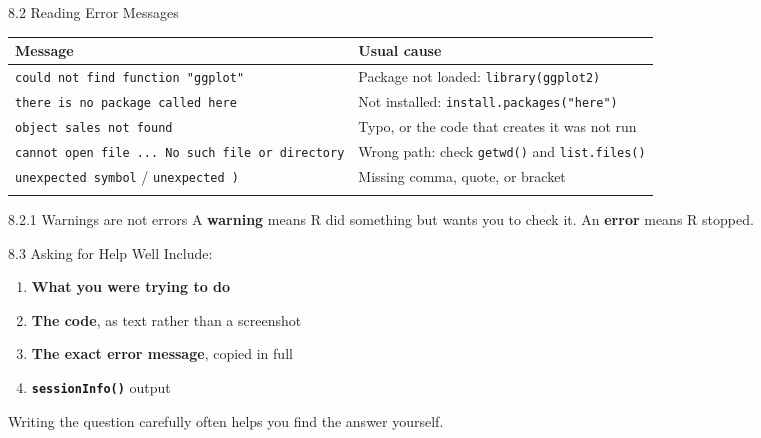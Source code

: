 \documentclass[
  ignorenonframetext,
  aspectratio=169,
]{beamer}
\newcounter{none} %
\providecommand{\tightlist}{%
  \setlength{\itemsep}{0pt}\setlength{\parskip}{0pt}}
\begin{document}
\begin{frame}[fragile]{8.2 Reading Error Messages}
\protect{}\label{reading-error-messages}
{\def\LTcaptype{none} %
\begin{longtable}[]{@{}
  >{\raggedright\arraybackslash}p{}
  >{\raggedright\arraybackslash}p{}@{}}
\toprule\noalign{}
\begin{minipage}[b]{\linewidth}\raggedright
Message
\end{minipage} & \begin{minipage}[b]{\linewidth}\raggedright
Usual cause
\end{minipage} \\
\midrule\noalign{}
\endhead
\texttt{could\ not\ find\ function\ "ggplot"} & Package not loaded:
\texttt{library(ggplot2)} \\
\texttt{there\ is\ no\ package\ called\ \textquotesingle{}here\textquotesingle{}}
& Not installed: \texttt{install.packages("here")} \\
\texttt{object\ \textquotesingle{}sales\textquotesingle{}\ not\ found} &
Typo, or the code that creates it was not run \\
\texttt{cannot\ open\ file\ ...\ No\ such\ file\ or\ directory} & Wrong
path: check \texttt{getwd()} and \texttt{list.files()} \\
\texttt{unexpected\ symbol} /
\texttt{unexpected\ \textquotesingle{})\textquotesingle{}} & Missing
comma, quote, or bracket \\
\bottomrule\noalign{}
\end{longtable}
}

\begin{exampleblock}{8.2.1 Warnings are not errors}
\protect{}\label{warnings-are-not-errors}
A \textbf{warning} means R did something but wants you to check it. An
\textbf{error} means R stopped.
\end{exampleblock}
\end{frame}

\begin{frame}[fragile]{8.3 Asking for Help Well}
\protect{}\label{asking-for-help-well}
Include:

\begin{enumerate}
\tightlist
\item
  \textbf{What you were trying to do}
\item
  \textbf{The code}, as text rather than a screenshot
\item
  \textbf{The exact error message}, copied in full
\item
  \textbf{\texttt{sessionInfo()}} output
\end{enumerate}

Writing the question carefully often helps you find the answer yourself.
\end{frame}
\end{document}
